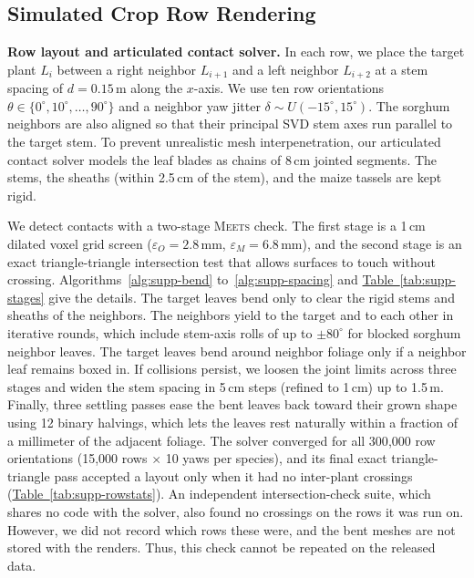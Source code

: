 \documentclass[10pt,twocolumn,letterpaper]{article}
\newcommand{\Meets}{\textsc{Meets}}
\newcommand{\tabref}[1]{\hyperref[#1]{Table~\ref*{#1}}}
\begin{document}
\subsection{Simulated Crop Row Rendering}
\noindent\textbf{Row layout and articulated contact solver.}
In each row, we place the target plant $L_i$ between a right neighbor $L_{i+1}$ and a left neighbor $L_{i+2}$ at a stem spacing of $d = 0.15$\,m along the $x$-axis. We use ten row orientations $\theta \in \{0^\circ, 10^\circ, \dots, 90^\circ\}$ and a neighbor yaw jitter $\delta \sim U(-15^\circ, 15^\circ)$. The sorghum neighbors are also aligned so that their principal SVD stem axes run parallel to the target stem. To prevent unrealistic mesh interpenetration, our articulated contact solver models the leaf blades as chains of 8\,cm jointed segments. The stems, the sheaths (within 2.5\,cm of the stem), and the maize tassels are kept rigid.

We detect contacts with a two-stage \Meets{} check. The first stage is a 1\,cm dilated voxel grid screen ($\varepsilon_O = 2.8$\,mm, $\varepsilon_M = 6.8$\,mm), and the second stage is an exact triangle-triangle intersection test that allows surfaces to touch without crossing. Algorithms~\ref{alg:supp-bend} to~\ref{alg:supp-spacing} and \tabref{tab:supp-stages} give the details. The target leaves bend only to clear the rigid stems and sheaths of the neighbors. The neighbors yield to the target and to each other in iterative rounds, which include stem-axis rolls of up to $\pm 80^\circ$ for blocked sorghum neighbor leaves. The target leaves bend around neighbor foliage only if a neighbor leaf remains boxed in. If collisions persist, we loosen the joint limits across three stages and widen the stem spacing in 5\,cm steps (refined to 1\,cm) up to 1.5\,m. Finally, three settling passes ease the bent leaves back toward their grown shape using 12 binary halvings, which lets the leaves rest naturally within a fraction of a millimeter of the adjacent foliage. The solver converged for all 300{,}000 row orientations (15{,}000 rows $\times$ 10 yaws per species), and its final exact triangle-triangle pass accepted a layout only when it had no inter-plant crossings (\tabref{tab:supp-rowstats}). An independent intersection-check suite, which shares no code with the solver, also found no crossings on the rows it was run on. However, we did not record which rows these were, and the bent meshes are not stored with the renders. Thus, this check cannot be repeated on the released data.
\end{document}
